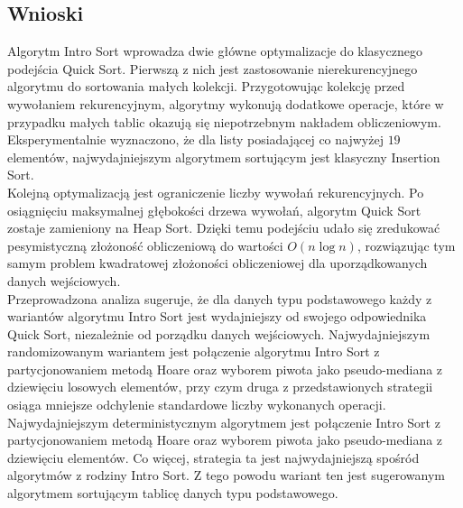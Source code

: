 \begin{figure}[]
	\centering
	
	\caption[]{}
	\label{fig:intro-sort-nondeterministic-pivot-random}
\end{figure}

\begin{figure}[]
	\centering
	
	\caption[]{}
	\label{fig:intro-sort-nondeterministic-pivot-reversed}
\end{figure}

\begin{figure}[]
	\centering
	
	\caption[]{}
	\label{fig:intro-sort-nondeterministic-pivot-density}
\end{figure}

\subsection{Wnioski}
Algorytm Intro Sort wprowadza dwie główne optymalizacje do klasycznego podejścia Quick Sort. Pierwszą z nich jest zastosowanie nierekurencyjnego algorytmu do sortowania małych kolekcji. Przygotowując kolekcję przed wywołaniem rekurencyjnym, algorytmy wykonują dodatkowe operacje, które w przypadku małych tablic okazują się niepotrzebnym nakładem obliczeniowym. Eksperymentalnie wyznaczono, że dla listy posiadającej co najwyżej $19$ elementów, najwydajniejszym algorytmem sortującym jest klasyczny Insertion Sort.\\

Kolejną optymalizacją jest ograniczenie liczby wywołań rekurencyjnych. Po osiągnięciu maksymalnej głębokości drzewa wywołań, algorytm Quick Sort zostaje zamieniony na Heap Sort. Dzięki temu podejściu udało się zredukować pesymistyczną złożoność obliczeniową do wartości $O(n\log{n})$, rozwiązując tym samym problem kwadratowej złożoności obliczeniowej dla uporządkowanych danych wejściowych.\\

Przeprowadzona analiza sugeruje, że dla danych typu podstawowego każdy z wariantów algorytmu Intro Sort jest wydajniejszy od swojego odpowiednika Quick Sort, niezależnie od porządku danych wejściowych. Najwydajniejszym randomizowanym wariantem jest połączenie algorytmu Intro Sort z partycjonowaniem metodą Hoare oraz wyborem piwota jako pseudo-mediana z dziewięciu losowych elementów, przy czym druga z przedstawionych strategii osiąga mniejsze odchylenie standardowe liczby wykonanych operacji.\\

Najwydajniejszym deterministycznym algorytmem jest połączenie Intro Sort z partycjonowaniem metodą Hoare oraz wyborem piwota jako pseudo-mediana z dziewięciu elementów. Co więcej, strategia ta jest najwydajniejszą spośród algorytmów z rodziny Intro Sort. Z tego powodu wariant ten jest sugerowanym algorytmem sortującym tablicę danych typu podstawowego.\\
